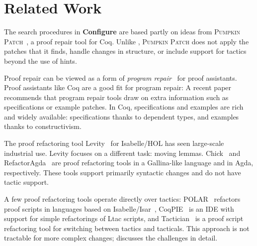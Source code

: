 \section{Related Work}
\label{sec:related}


The search procedures in \textbf{Configure} are based partly on ideas from \textsc{Pumpkin Patch}~\cite{pumpkinpatch}, a proof repair tool for Coq.
Unlike \toolname, \textsc{Pumpkin Patch} does not apply the patches that it finds,
handle changes in structure, or include support for tactics beyond the use of hints.

Proof repair can be viewed as a form of \textit{program repair}~\cite{Monperrus:2018:ASR:3177787.3105906, Gazzola:2018:ASR:3180155.3182526}
for proof assistants.
Proof assistants like Coq are a good fit for program repair: A recent paper~\cite{Qi:2015:APP:2771783.2771791} 
recommends that program repair tools draw on extra information
such as specifications or example patches. In Coq, specifications and examples 
are rich and widely available: specifications thanks to dependent types,
and examples thanks to constructivism.

The proof refactoring tool Levity~\cite{Bourke12} for Isabelle/HOL has seen large-scale industrial use.
Levity focuses on a different task: moving lemmas.
Chick~\cite{robert2018} and RefactorAgda~\cite{wibergh2019} are proof refactoring tools
in a Gallina-like language and in Agda, respectively.
These tools support primarily syntactic changes and do not have tactic support.

A few proof refactoring tools operate directly over tactics:
POLAR~\cite{Dietrich2013} refactors proof scripts in languages based on Isabelle/Isar~\cite{Wenzel2007isar},
CoqPIE~\cite{Roe2016} is an IDE with support for simple refactorings of Ltac scripts, and
Tactician~\cite{adams2015} is a proof script refactoring tool for switching between tactics and tacticals.
This approach is not tractable for more complex changes;
\citet{robert2018} discusses the challenges in detail.

